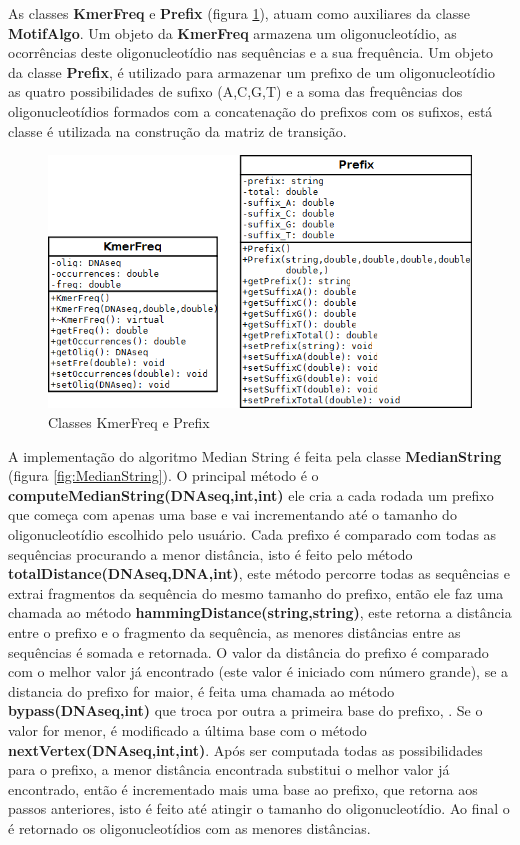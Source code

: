 As classes \textbf{KmerFreq} e \textbf{Prefix} (figura \ref{fig:KmerPrefix}), atuam como auxiliares da classe \textbf{MotifAlgo}. Um objeto da \textbf{KmerFreq} armazena um oligonucleotídio, as ocorrências deste oligonucleotídio nas sequências e a sua frequência. Um objeto da classe \textbf{Prefix}, é utilizado para armazenar um prefixo de um oligonucleotídio as quatro possibilidades de sufixo (A,C,G,T) e a soma das frequências dos oligonucleotídios formados com a concatenação do prefixos com os sufixos, está classe é utilizada na construção da matriz de transição.

\begin{figure}[htb!]
    \centering
    \includegraphics[scale=0.7]{./imagens/KmerPrefix.png}
    \caption{Classes KmerFreq e Prefix}
    \label{fig:KmerPrefix}
\end{figure}


A implementação do algoritmo Median String é feita pela classe \textbf{MedianString} (figura \ref{fig:MedianString}). O principal método é o  \textbf{computeMedianString(DNAseq,int,int)} ele cria a cada rodada um prefixo que começa com apenas uma base e vai incrementando até o tamanho do oligonucleotídio escolhido pelo usuário. Cada prefixo é comparado com todas as sequências procurando a menor distância, isto é feito pelo método \textbf{totalDistance(DNAseq,DNA,int)}, este método percorre todas as sequências e extrai fragmentos da sequência do mesmo tamanho do prefixo, então ele faz uma chamada ao método \textbf{hammingDistance(string,string)}, este retorna a distância entre o prefixo e o fragmento da sequência, as menores distâncias entre as sequências é somada e retornada. O valor da distância do prefixo é comparado com o melhor valor já encontrado (este valor é iniciado com número grande), se a distancia do prefixo for maior, é feita uma chamada ao método \textbf{bypass(DNAseq,int)} que troca por outra a primeira base do prefixo, . Se o valor for menor, é modificado  a última base com o método \textbf{nextVertex(DNAseq,int,int)}. Após ser computada todas as possibilidades para o prefixo, a menor distância encontrada substitui o melhor valor já encontrado, então é incrementado mais uma base ao prefixo, que retorna aos passos anteriores, isto é feito até atingir o tamanho do oligonucleotídio. Ao final o é retornado os oligonucleotídios com as menores distâncias.

